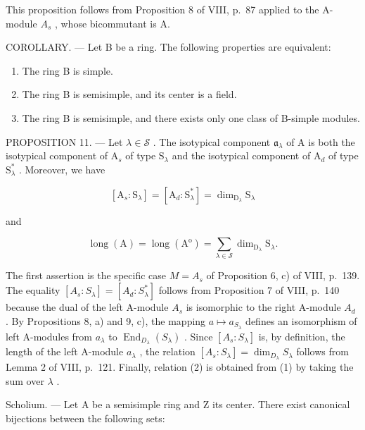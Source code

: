 This proposition follows from Proposition 8 of VIII, p.~87 applied to the A-module \(A_{s}\) , whose bicommutant is A.

COROLLARY. --- Let B be a ring. The following properties are equivalent:

\begin{enumerate}
\def\labelenumi{(\roman{enumi})}
\item
  The ring B is simple.
\item
  The ring B is semisimple, and its center is a field.
\item
  The ring B is semisimple, and there exists only one class of B-simple modules.
\end{enumerate}

PROPOSITION 11. --- Let \(\lambda \in \mathcal{S}\) . The isotypical component \(\mathfrak{a}_{\lambda}\) of A is both the isotypical component of \(\mathrm{A}_s\) of type \(\mathrm{S}_{\lambda}\) and the isotypical component of \(\mathrm{A}_d\) of type \(\mathrm{S}_{\lambda}^{*}\) . Moreover, we have

\[
[ \mathrm{A} _ {s}: \mathrm{S} _ {\lambda} ] = [ \mathrm{A} _ {d}: \mathrm{S} _ {\lambda} ^ {*} ] = \dim_ {\mathrm{D} _ {\lambda}} \mathrm{S} _ {\lambda}\tag{1}
\]

and

\[
\operatorname{long} (\mathrm{A}) = \operatorname{long} \left(\mathrm{A} ^ {\mathrm{o}}\right) = \sum_ {\lambda \in \mathscr {S}} \dim_ {\mathrm{D} _ {\lambda}} \mathrm{S} _ {\lambda}.\tag{2}
\]

The first assertion is the specific case \(M = A_{s}\) of Proposition 6, c) of VIII, p.~139. The equality \([A_{s} : S_{\lambda}] = [A_{d} : S_{\lambda}^{*}]\) follows from Proposition 7 of VIII, p.~140 because the dual of the left A-module \(A_{s}\) is isomorphic to the right A-module \(A_{d}\) . By Propositions 8, a) and 9, c), the mapping \(a \mapsto a_{S_{\lambda}}\) defines an isomorphism of left A-modules from \(a_{\lambda}\) to \(\operatorname{End}_{D_{\lambda}}(S_{\lambda})\) . Since \([A_{s} : S_{\lambda}]\) is, by definition, the length of the left A-module \(a_{\lambda}\) , the relation \([A_{s} : S_{\lambda}] = \dim_{D_{\lambda}} S_{\lambda}\) follows from Lemma 2 of VIII, p.~121. Finally, relation (2) is obtained from (1) by taking the sum over \(\lambda\) .

Scholium. --- Let A be a semisimple ring and Z its center. There exist canonical bijections between the following sets:

